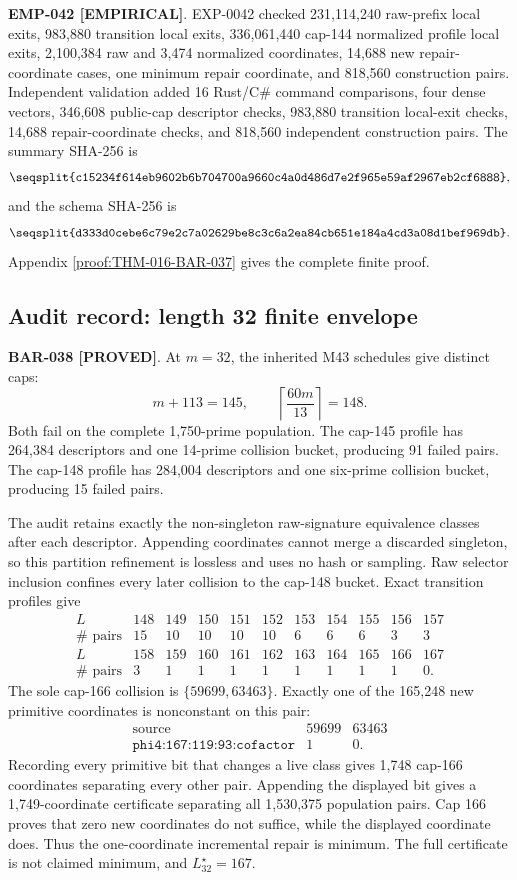\documentclass[11pt]{article}
\newcommand{\claimstatus}[2]{\textbf{#1 [#2]}}
\begin{document}
\claimstatus{EMP-042}{EMPIRICAL}. EXP-0042 checked 231,114,240 raw-prefix
local exits, 983,880 transition local exits, 336,061,440 cap-144 normalized
profile local exits, 2,100,384 raw and 3,474 normalized coordinates, 14,688
new repair-coordinate cases, one minimum repair coordinate, and 818,560
construction pairs. Independent validation added 16 Rust/C\# command
comparisons, four dense vectors, 346,608 public-cap descriptor checks,
983,880 transition local-exit checks, 14,688 repair-coordinate checks, and
818,560 independent construction pairs. The summary SHA-256 is
\[
\texttt{\seqsplit{c15234f614eb9602b6b704700a9660c4a0d486d7e2f965e59af2967eb2cf6888}},
\]
and the schema SHA-256 is
\[
\texttt{\seqsplit{d333d0cebe6c79e2c7a02629be8c3c6a2ea84cb651e184a4cd3a08d1bef969db}}.
\]
Appendix \ref{proof:THM-016-BAR-037} gives the complete finite proof.

\subsection{Audit record: length 32 finite envelope}

\claimstatus{BAR-038}{PROVED}. At \(m=32\), the inherited M43 schedules give
distinct caps:
\[
m+113=145,\qquad
\left\lceil\frac{60m}{13}\right\rceil=148.
\]
Both fail on the complete 1,750-prime population. The cap-145 profile has
264,384 descriptors and one 14-prime collision bucket, producing 91 failed
pairs. The cap-148 profile has 284,004 descriptors and one six-prime
collision bucket, producing 15 failed pairs.

The audit retains exactly the non-singleton raw-signature equivalence
classes after each descriptor. Appending coordinates cannot merge a
discarded singleton, so this partition refinement is lossless and uses no
hash or sampling. Raw selector inclusion confines every later collision to
the cap-148 bucket. Exact transition profiles give
\[
\begin{array}{c|rrrrrrrrrr}
L&148&149&150&151&152&153&154&155&156&157\\
\hline
\#\text{ pairs}&15&10&10&10&10&6&6&6&3&3
\end{array}
\]
\[
\begin{array}{c|rrrrrrrrrr}
L&158&159&160&161&162&163&164&165&166&167\\
\hline
\#\text{ pairs}&3&1&1&1&1&1&1&1&1&0.
\end{array}
\]
The sole cap-166 collision is \(\{59699,63463\}\). Exactly one of the
165,248 new primitive coordinates is nonconstant on this pair:
\[
\begin{array}{c|rr}
\text{source}&59699&63463\\
\hline
\texttt{phi4:167:119:93:cofactor}&1&0.
\end{array}
\]
Recording every primitive bit that changes a live class gives 1,748
cap-166 coordinates separating every other pair. Appending the displayed
bit gives a 1,749-coordinate certificate separating all 1,530,375
population pairs. Cap 166 proves that zero new coordinates do not suffice,
while the displayed coordinate does. Thus the one-coordinate incremental
repair is minimum. The full certificate is not claimed minimum, and
\(L_{32}^{\star}=167\).
\end{document}
